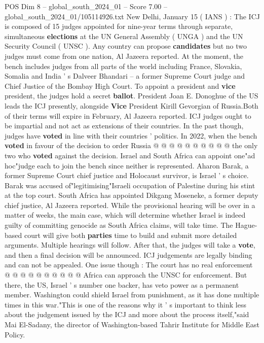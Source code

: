\begin{textsample}{POS Dim 8 – global\_south\_2024\_01 – Score 7.00 – global\_south\_2024\_01/105114926.txt}  \label{ex:f8_pos_281}
New Delhi, January 15 ( IANS ) : The ICJ is composed of 15 judges appointed for nine-year terms through separate, simultaneous \textbf{elections} at the UN General Assembly ( UNGA ) and the UN Security Council ( UNSC ).
Any country can propose \textbf{candidates} but no two judges must come from one nation, Al Jazeera reported.
At the moment, the bench includes judges from all parts of the world including France, Slovakia, Somalia and India ' s Dalveer Bhandari -- a former Supreme Court judge and Chief Justice of the Bombay High Court.
To appoint a president and \textbf{vice} president, the judges hold a secret \textbf{ballot}.
President Joan E.
Donoghue of the US leads the ICJ presently, alongside \textbf{Vice} President Kirill Gevorgian of Russia.Both of their terms will expire in February, Al Jazeera reported.
ICJ judges ought to be impartial and not act as extensions of their countries.
In the past though, judges have \textbf{voted} in line with their countries ' politics.
In 2022, when the bench \textbf{voted} in favour of the decision to order Russia @ @ @ @ @ @ @ @ @ @ the only two who \textbf{voted} against the decision.
Israel and South Africa can appoint one"ad hoc"judge each to join the bench since neither is represented.
Aharon Barak, a former Supreme Court chief justice and Holocaust survivor, is Israel ' s choice.
Barak was accused of"legitimising"Israeli occupation of Palestine during his stint at the top court.
South Africa has appointed Dikgang Moseneke, a former deputy chief justice, Al Jazeera reported.
While the provisional hearing will be over in a matter of weeks, the main case, which will determine whether Israel is indeed guilty of committing genocide as South Africa claims, will take time.
The Hague-based court will give both \textbf{parties} time to build and submit more detailed arguments.
Multiple hearings will follow.
After that, the judges will take a \textbf{vote}, and then a final decision will be announced.
ICJ judgements are legally binding and can not be appealed.
One issue though : The court has no real enforcement @ @ @ @ @ @ @ @ @ @ Africa can approach the UNSC for enforcement.
But there, the US, Israel ' s number one backer, has veto power as a permanent member.
Washington could shield Israel from punishment, as it has done multiple times in this war."This is one of the reasons why it ' s important to think less about the judgement issued by the ICJ and more about the process itself,"said Mai El-Sadany, the director of Washington-based Tahrir Institute for Middle East Policy.

\end{textsample}
